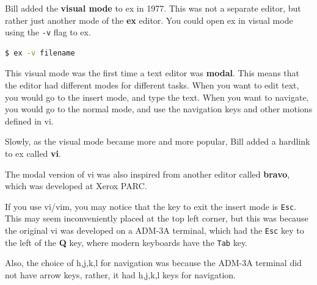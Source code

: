 Bill added the \textbf{visual mode} to ex in 1977.
This was not a separate editor, but rather just another mode
of the \textbf{ex} editor.
You could open ex in visual mode using the \texttt{-v} flag to
ex.

\begin{lstlisting}[language=bash]
$ ex -v filename
\end{lstlisting}

This visual mode was the first time a text editor
was \textbf{modal}.
This means that the editor had different modes for different tasks.
When you want to edit text, you would go to the insert mode,
and type the text.
When you want to navigate, you would go to the normal mode,
and use the navigation keys and other motions defined in vi.

Slowly, as the visual mode became more and more popular,
Bill added a hardlink to ex called \textbf{vi}.

The modal version of vi was also inspired from another
editor called \textbf{bravo}, which was developed at Xerox PARC.

If you use vi/vim, you may notice that the key to
exit the insert mode is \texttt{Esc}.
This may seem inconveniently placed at the top left corner,
but this was because the original vi was developed on a
ADM-3A terminal, which had the \texttt{Esc} key to the left
of the \textbf{Q} key, where modern keyboards have the \texttt{Tab} key.

Also, the choice of h,j,k,l for navigation was because
the ADM-3A terminal did not have arrow keys,
rather, it had h,j,k,l keys for navigation.

